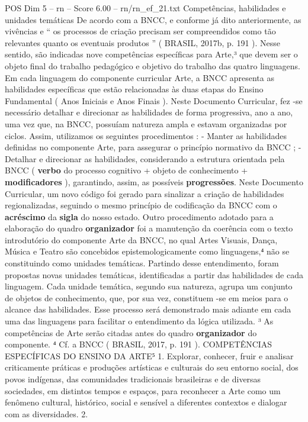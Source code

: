 \begin{textsample}{POS Dim 5 – rn – Score 6.00 – rn/rn\_ef\_21.txt}  \label{ex:f5_pos_144}
Competências, habilidades e unidades temáticas De acordo com a BNCC, e conforme já dito anteriormente, as vivências e “ os processos de criação precisam ser compreendidos como tão relevantes quanto os eventuais produtos ” ( BRASIL, 2017b, p. 191 ).
Nesse sentido, são indicadas nove competências específicas para Arte,³ que devem ser o objeto final do trabalho pedagógico e objetivo do trabalho das quatro linguagens.
Em cada linguagem do componente curricular Arte, a BNCC apresenta as habilidades específicas que estão relacionadas às duas etapas do Ensino Fundamental ( Anos Iniciais e Anos Finais ).
Neste Documento Curricular, fez -se necessário detalhar e direcionar as habilidades de forma progressiva, ano a ano, uma vez que, na BNCC, possuíam natureza ampla e estavam organizadas por ciclos.
Assim, utilizamos os seguintes procedimentos : - Manter as habilidades definidas no componente Arte, para assegurar o princípio normativo da BNCC ; - Detalhar e direcionar as habilidades, considerando a estrutura orientada pela BNCC ( \textbf{verbo} do processo cognitivo + objeto de conhecimento + \textbf{modificadores} ), garantindo, assim, as possíveis \textbf{progressões}.
Neste Documento Curricular, um novo código foi gerado para sinalizar a criação de habilidades regionalizadas, seguindo o mesmo princípio de codificação da BNCC com o \textbf{acréscimo} da \textbf{sigla} do nosso estado.
Outro procedimento adotado para a elaboração do quadro \textbf{organizador} foi a manutenção da coerência com o texto introdutório do componente Arte da BNCC, no qual Artes Visuais, Dança, Música e Teatro são concebidos epistemologicamente como linguagens,⁴ não se constituindo como unidades temáticas.
Partindo desse entendimento, foram propostas novas unidades temáticas, identificadas a partir das habilidades de cada linguagem.
Cada unidade temática, segundo sua natureza, agrupa um conjunto de objetos de conhecimento, que, por sua vez, constituem -se em meios para o alcance das habilidades.
Esse processo será demonstrado mais adiante em cada uma das linguagens para facilitar o entendimento da lógica utilizada. ³ As competências de Arte serão citadas antes do quadro \textbf{organizador} do componente. ⁴ Cf. a BNCC ( BRASIL, 2017, p. 191 ).
COMPETÊNCIAS ESPECÍFICAS DO ENSINO DA ARTE⁵ 1.
Explorar, conhecer, fruir e analisar criticamente práticas e produções artísticas e culturais do seu entorno social, dos povos indígenas, das comunidades tradicionais brasileiras e de diversas sociedades, em distintos tempos e espaços, para reconhecer a Arte como um fenômeno cultural, histórico, social e sensível a diferentes contextos e dialogar com as diversidades. 2.

\end{textsample}
